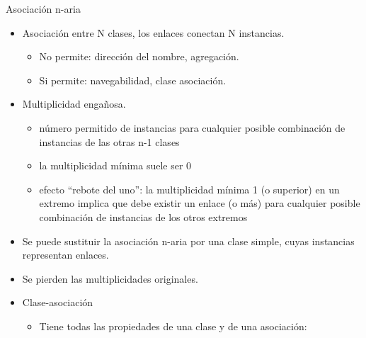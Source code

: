 \documentclass[12pt, twoside, openright]{report} %
\begin{document}
Asociación n-aria

\begin{itemize}
	\item Asociación entre N clases, los enlaces conectan N instancias.

	      \begin{itemize}
		      \item No permite: dirección del nombre, agregación.
		      \item Si permite: navegabilidad, clase asociación.
	      \end{itemize}
	\item Multiplicidad engañosa.
	      \begin{itemize}
		      \item número permitido de instancias para cualquier posible combinación de
		            instancias de las otras n-1 clases
		      \item la multiplicidad mínima suele ser 0
		      \item efecto “rebote del uno”: la multiplicidad mínima 1 (o superior) en un extremo
		            implica que debe existir un enlace (o más) para cualquier posible combinación de
		            instancias de los otros extremos
	      \end{itemize}
	\item Se puede sustituir la asociación n-aria por una clase simple,
	      cuyas instancias representan enlaces.
	\item Se pierden las multiplicidades originales.
	\item Clase-asociación

	      \begin{itemize}
		      \item Tiene todas las propiedades de una clase y de una asociación:


\end{itemize}
\end{itemize}
\end{document}
